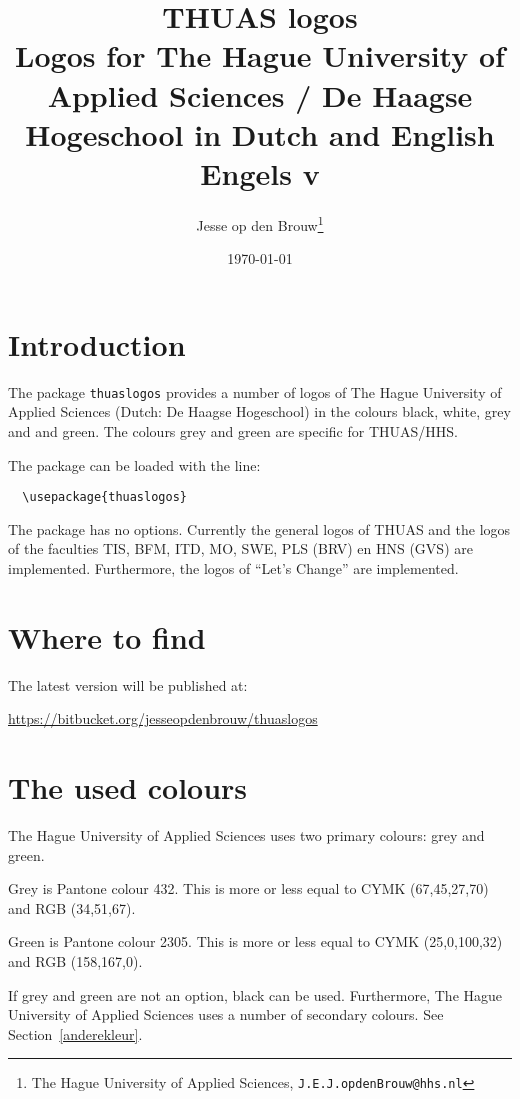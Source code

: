\documentclass[a4paper,12pt]{article}
\author{Jesse op den Brouw\thanks{The Hague University of Applied Sciences, \texttt{J.E.J.opdenBrouw@hhs.nl}}}
\title{THUAS logos\\[2ex] \large Logos for The Hague University of Applied Sciences / De Haagse Hogeschool in Dutch and English Engels v\fileversion}
\date{\today}
\begin{document}
\maketitle

\begin{multicols}{2}[\setlength{\columnsep}{30pt}\section*{\contentsname}]
\makeatletter
{}%
\makeatother
\end{multicols}
\clearpage


\section{Introduction}
The package \verb|thuaslogos| provides a number of logos of The Hague University of Applied Sciences
(Dutch:  De Haagse Hogeschool) in the colours black, white, grey and and green. The colours grey and
green are specific for THUAS/HHS.

The package can be loaded with the line:

\verb|  \usepackage{thuaslogos}|

The package has no options. Currently the general logos of THUAS and the logos of the
faculties TIS, BFM, ITD, MO, SWE, PLS (BRV) en HNS (GVS) are implemented. Furthermore,
the logos of ``Let's Change'' are implemented.


\section{Where to find}
The latest version will be published at:

\url{https://bitbucket.org/jesseopdenbrouw/thuaslogos}


\section{The used colours}
The Hague University of Applied Sciences uses two primary colours: grey and green.

Grey is Pantone colour 432. This is more or less equal to CYMK (67,45,27,70) and RGB (34,51,67).

Green is Pantone colour 2305. This is more or less equal to CYMK (25,0,100,32) and RGB (158,167,0).

If grey and green are not an option, black can be used. Furthermore, The Hague University of
Applied Sciences uses a number of secondary colours. See Section~\ref{anderekleur}.
\end{document}
